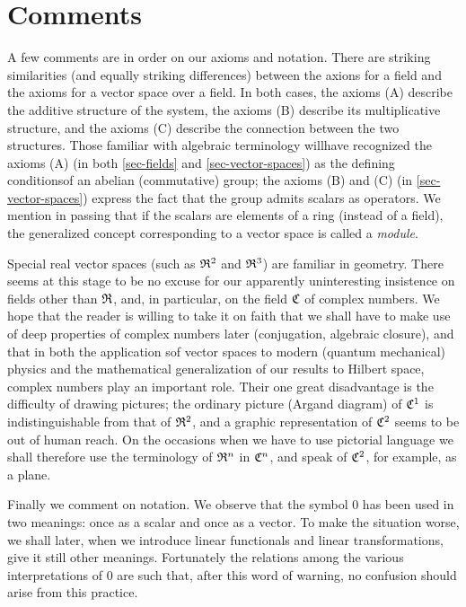 \section{Comments}\label{sec-comments}

A few comments are in order on our axioms and notation. There are striking
similarities (and equally striking differences) between the axions for a field
and the axioms for a vector space over a field. In both cases, the axioms (A)
describe the additive structure of the system, the axioms (B) describe its
multiplicative structure, and the axioms (C) describe the connection between the
two structures. Those familiar with algebraic terminology willhave recognized
the axioms (A) (in both \cref{sec-fields} and \cref{sec-vector-spaces}) as the
defining conditionsof an abelian (commutative) group; the axioms (B) and (C) (in
\cref{sec-vector-spaces}) express the fact that the group admits scalars as
operators. We mention in passing that if the scalars are elements of a ring
(instead of a field), the generalized concept corresponding to a vector space is
called a \emph{module}.

Special real vector spaces (such as \(\mathfrak{R}^2\) and \(\mathfrak{R}^3\)) are familiar
in geometry. There seems at this stage to be no excuse for our apparently
uninteresting insistence on fields other than \(\mathfrak{R}\), and, in particular, on
the field \(\mathfrak{C}\) of complex numbers. We hope that the reader is willing to
take it on faith that we shall have to make use of deep properties of complex
numbers later (conjugation, algebraic closure), and that in both the application
sof vector spaces to modern (quantum mechanical) physics and the mathematical
generalization of our results to Hilbert space, complex numbers play an
important role. Their one great disadvantage is the difficulty of drawing
pictures; the ordinary picture (Argand diagram) of \(\mathfrak{C}^1\) is
indistinguishable from that of \(\mathfrak{R}^2\), and a graphic representation of
\(\mathfrak{C}^2\) seems to be out of human reach. On the occasions when we have to
use pictorial language we shall therefore use the terminology of \(\mathfrak{R}^n\) in
\(\mathfrak{C}^n\), and speak of \(\mathfrak{C}^2\), for example, as a plane.

Finally we comment on notation. We observe that the symbol \(0\) has been used
in two meanings: once as a scalar and once as a vector. To make the situation
worse, we shall later, when we introduce linear functionals and linear
transformations, give it still other meanings. Fortunately the relations among
the various interpretations of \(0\) are such that, after this word of warning,
no confusion should arise from this practice.

